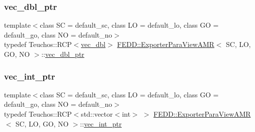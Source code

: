 \mbox{\label{classFEDD_1_1ExporterParaViewAMR_af14032ec6d32d3bef9ecf62bd31591a0}} 
\subsubsection{\texorpdfstring{vec\+\_\+dbl\+\_\+ptr}{vec\_dbl\_ptr}}
{\footnotesize\ttfamily template$<$class SC  = default\+\_\+sc, class LO  = default\+\_\+lo, class GO  = default\+\_\+go, class NO  = default\+\_\+no$>$ \\
typedef Teuchos\+::\+R\+CP$<$\hyperlink{classFEDD_1_1ExporterParaViewAMR_a40cb07542819da8787f6326b973488e1}{vec\+\_\+dbl}$>$ \hyperlink{classFEDD_1_1ExporterParaViewAMR}{F\+E\+D\+D\+::\+Exporter\+Para\+View\+A\+MR}$<$ SC, LO, GO, NO $>$\+::\hyperlink{classFEDD_1_1ExporterParaViewAMR_af14032ec6d32d3bef9ecf62bd31591a0}{vec\+\_\+dbl\+\_\+ptr}}

\mbox{\label{classFEDD_1_1ExporterParaViewAMR_a45e7db5ec3faf02fd1e2501ea28ba3dd}} 
\subsubsection{\texorpdfstring{vec\+\_\+int\+\_\+ptr}{vec\_int\_ptr}}
{\footnotesize\ttfamily template$<$class SC  = default\+\_\+sc, class LO  = default\+\_\+lo, class GO  = default\+\_\+go, class NO  = default\+\_\+no$>$ \\
typedef Teuchos\+::\+R\+CP$<$std\+::vector$<$int$>$ $>$ \hyperlink{classFEDD_1_1ExporterParaViewAMR}{F\+E\+D\+D\+::\+Exporter\+Para\+View\+A\+MR}$<$ SC, LO, GO, NO $>$\+::\hyperlink{classFEDD_1_1ExporterParaViewAMR_a45e7db5ec3faf02fd1e2501ea28ba3dd}{vec\+\_\+int\+\_\+ptr}}

\mbox{\label{classFEDD_1_1ExporterParaViewAMR_a48d0c5c5de711255407680b44226ce70}} 
